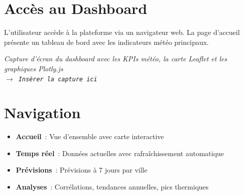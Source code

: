 \documentclass[a4paper,12pt,oneside]{report}
\newcommand{\imgplaceholder}[2]{%
  \begin{tcolorbox}[colback=blue!5,colframe=blue!40,title=#1]
    \centering\itshape #2\\[6pt]
    \texttt{$\rightarrow$ Insérer la capture ici}
  \end{tcolorbox}
}
\begin{document}
\section{Accès au Dashboard}
L'utilisateur accède à la plateforme via un navigateur web. La page d'accueil présente un tableau de bord avec les indicateurs météo principaux.

\imgplaceholder{Figure — Dashboard principal}{Capture d'écran du dashboard avec les KPIs météo, la carte Leaflet et les graphiques Plotly.js}

\section{Navigation}
\begin{itemize}
  \item \textbf{Accueil}~: Vue d'ensemble avec carte interactive
  \item \textbf{Temps réel}~: Données actuelles avec rafraîchissement automatique
  \item \textbf{Prévisions}~: Prévisions à 7 jours par ville
  \item \textbf{Analyses}~: Corrélations, tendances annuelles, pics thermiques
\end{itemize}
\end{document}

